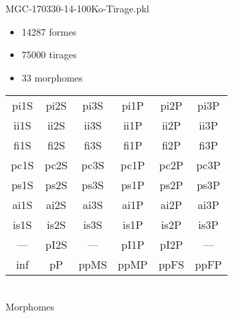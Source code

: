 MGC-170330-14-100Ko-Tirage.pkl
\begin{itemize}
\item 14287 formes
\item 75000 tirages
\item 33 morphomes
\end{itemize}
\begin{center}
\begin{tabular}{cccccc}
\hline
\cellcolor{white}pi1S & \cellcolor{orange}pi2S & \cellcolor{orange}pi3S & \cellcolor{white}pi1P & \cellcolor{white}pi2P & \cellcolor{white}pi3P\\
\cellcolor{brown}ii1S & \cellcolor{brown}ii2S & \cellcolor{brown}ii3S & \cellcolor{white}ii1P & \cellcolor{white}ii2P & \cellcolor{brown}ii3P\\
\cellcolor{yellow}fi1S & \cellcolor{lime}fi2S & \cellcolor{lime}fi3S & \cellcolor{green}fi1P & \cellcolor{white}fi2P & \cellcolor{green}fi3P\\
\cellcolor{yellow}pc1S & \cellcolor{yellow}pc2S & \cellcolor{yellow}pc3S & \cellcolor{white}pc1P & \cellcolor{white}pc2P & \cellcolor{yellow}pc3P\\
\cellcolor{teal}ps1S & \cellcolor{teal}ps2S & \cellcolor{teal}ps3S & \cellcolor{white}ps1P & \cellcolor{white}ps2P & \cellcolor{teal}ps3P\\
\cellcolor{white}ai1S & \cellcolor{lightgray}ai2S & \cellcolor{lightgray}ai3S & \cellcolor{white}ai1P & \cellcolor{blue}ai2P & \cellcolor{white}ai3P\\
\cellcolor{pink}is1S & \cellcolor{white}is2S & \cellcolor{lightgray}is3S & \cellcolor{white}is1P & \cellcolor{black}is2P & \cellcolor{pink}is3P\\
--- & \cellcolor{white}pI2S & --- & \cellcolor{white}pI1P & \cellcolor{blue}pI2P & ---\\
\cellcolor{white}inf & \cellcolor{white}pP & \cellcolor{white}ppMS & \cellcolor{white}ppMP & \cellcolor{white}ppFS & \cellcolor{white}ppFP\\
\hline
\end{tabular}\\
Morphomes
\end{center}
\bigskip

